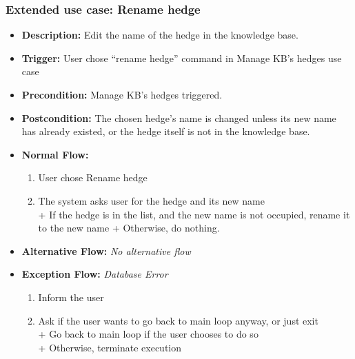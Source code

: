\documentclass[../gr-final.tex]{subfiles}
\begin{document}
\subsubsection{Extended use case: Rename hedge}
\begin{itemize}
  \item {\bfseries Description:} Edit the name of the hedge in the
    knowledge base. 
  \item {\bfseries Trigger:} User chose ``rename hedge'' command in
    Manage KB's hedges use case
  \item {\bfseries Precondition:} Manage KB's hedges triggered.
  \item {\bfseries Postcondition:} The chosen hedge's name is
    changed unless its new name has already existed, or the hedge
    itself is not in the knowledge base.
  \item {\bfseries Normal Flow:}
    \begin{enumerate}
      \item User chose Rename hedge
      \item The system asks user for the hedge and its new name\\
        \indent + If the hedge is in the list, and the new name
        is not occupied, rename it to the new name      
        \indent + Otherwise, do nothing.
    \end{enumerate}
  \item {\bfseries Alternative Flow:} {\em No alternative flow}
  \item {\bfseries Exception Flow:}
    {\em Database Error}
    \begin{enumerate}
      \item Inform the user
      \item Ask if the user wants to go back to main loop anyway,
        or just exit\\
        \indent + Go back to main loop if the user chooses to do
        so\\
        \indent + Otherwise, terminate execution
    \end{enumerate}
\end{itemize}
\end{document}
